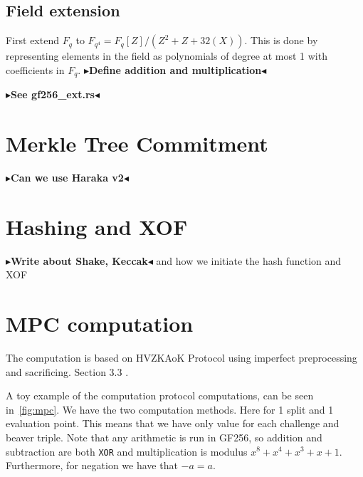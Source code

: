 \documentclass[twoside,11pt,openright]{report}
\theoremstyle{definition}
\theoremstyle{plain}
\newcommand{\todo}[1]{{\color[rgb]{.5,0,0}\textbf{$\blacktriangleright$#1$\blacktriangleleft$}}}
\begin{document}
\subsection{Field extension}

First extend $F_q$ to $F_{q^4} = F_q[Z] / (Z^2 + Z + 32(X))$. This is done by representing elements in the field as polynomials of degree at most 1 with coefficients in $F_q$. \todo{Define addition and multiplication}

\todo{See gf256\_ext.rs}

\section{Merkle Tree Commitment}

\todo{Can we use Haraka v2}

\section{Hashing and XOF}

\todo{Write about Shake, Keccak} and how we initiate the hash function and XOF

\section{MPC computation}

The computation is based on HVZKAoK Protocol using imperfect preprocessing and sacrificing. Section 3.3 \cite{baum2020concretely}.

A toy example of the computation protocol computations, can be seen in~\autoref{fig:mpc}. We have the two computation methods. Here for 1 split and 1 evaluation point. This means that we have only value for each challenge and beaver triple. Note that any arithmetic is run in GF256, so addition and subtraction are both \texttt{XOR} and multiplication is modulus $x^8 + x^4 + x^3 + x + 1$. Furthermore, for negation we have that $-a = a$.
\end{document}
